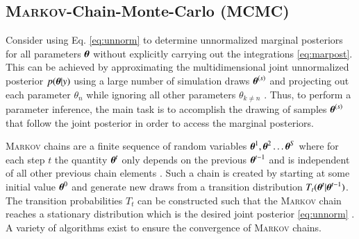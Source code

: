 \subsection{\textsc{Markov}-Chain-Monte-Carlo (MCMC)}
Consider using Eq. \eqref{eq:unnorm} to determine unnormalized marginal posteriors for all parameters $\boldsymbol{\theta}$ without explicitly carrying out the integrations \eqref{eq:marpost}. This can be achieved by approximating the multidimensional joint unnormalized posterior $p(\boldsymbol{\theta}|y)$ using a large number of simulation draws $\boldsymbol{\theta}^{(s)}$ and projecting out each parameter $\theta_n$ while ignoring all other parameters $\theta_{k\neq n}$ \cite{Trotta_2008}. Thus, to perform a parameter inference, the main task is to accomplish the drawing of samples $\boldsymbol{\theta}^{(s)}$ that follow the joint posterior in order to access the marginal posteriors.

\textsc{Markov} chains are a finite sequence of  random variables $\boldsymbol{\theta}^{1},\boldsymbol{\theta}^{2}\dots\boldsymbol{\theta}^S$ where for each step $t$ the quantity $\boldsymbol{\theta}^t$ only depends on the previous $\boldsymbol{\theta}^{t-1}$ and is independent  of all other previous chain elements \cite{bayes}. Such a chain is created by starting at some initial value $\boldsymbol{\theta}^0$ and generate new draws from a transition distribution $T_t(\boldsymbol{\theta}^t|\boldsymbol{\theta}^{t-1})$. The transition probabilities $T_t$ can be constructed such that the \textsc{Markov} chain reaches a stationary distribution which is the desired joint posterior \eqref{eq:unnorm} \cite{bayes,norris_1997}. A variety of algorithms exist to ensure the convergence of \textsc{Markov} chains. 
